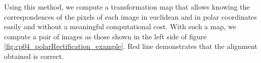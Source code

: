 Using this method, we compute a transformation map that allows knowing the correspondences of the pixels of each image in euclidean and in polar coordinates easily and without a meaningful computational cost. With such a map, we compute a pair of images as those shown in the left side of figure \ref{fig:cp04_polarRectification_example}. Red line demonstrates that the alignment obtained is correct. 

